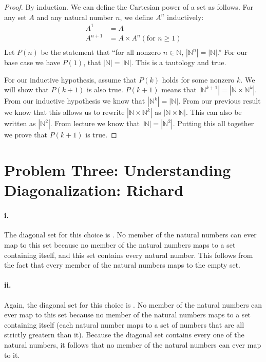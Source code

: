 \documentclass[10pt,letter]{article}
\begin{document}
\begin{proof} By induction. We can define the Cartesian power of a set as follows. For any set $A$ and any natural number $n$, we define $A^n$ inductively:
\begin{align*}
A^1 &= A \\
A^{n+1} &= A \times A^n (\text{for } n \ge 1)\\
\end{align*}
Let $P(n)$ be the statement that ``for all nonzero $n \in \mathbb{N}$, $|\mathbb{N}^n| = |\mathbb{N}|$.'' For our base case we have $P(1)$, that $|\mathbb{N}| = |\mathbb{N}|$. This is a tautology and true.

For our inductive hypothesis, assume that $P(k)$ holds for some nonzero $k$. We will show that $P(k+1)$ is also true. $P(k+1)$ means that $|\mathbb{N}^{k+1}| = |\mathbb{N} \times \mathbb{N}^k|$. From our inductive hypothesis we know that $|\mathbb{N}^k| = |\mathbb{N}|$. From our previous result we know that this allows us to rewrite $|\mathbb{N} \times \mathbb{N}^k|$ as $|\mathbb{N} \times \mathbb{N}|$. This can also be written as $|\mathbb{N}^2|$. From lecture we know that $|\mathbb{N}| = |\mathbb{N}^2|$. Putting this all together we prove that $P(k+1)$ is true.
\end{proof}


\section*{Problem Three: Understanding Diagonalization: Richard}

\paragraph{i.} The diagonal set for this choice is . No member of the natural numbers can ever map to this set because no member of the natural numbers maps to a set containing itself, and this set contains every natural number. This follows from the fact that every member of the natural numbers maps to the empty set.

\paragraph{ii.} Again, the diagonal set for this choice is . No member of the natural numbers can ever map to this set because no member of the natural numbers maps to a set containing itself (each natural number maps to a set of numbers that are all strictly greatern than it). Because the diagonal set contains every one of the natural numbers, it follows that no member of the natural numbers can ever map to it.
\end{document}
